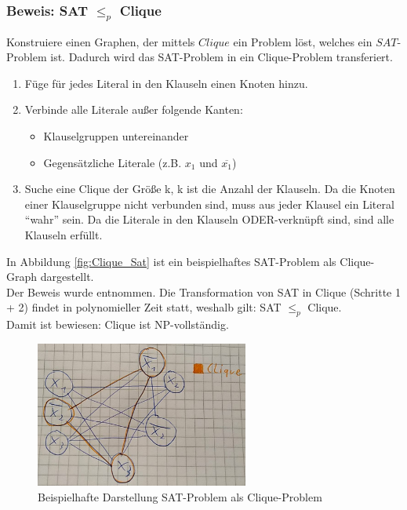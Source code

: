 \documentclass[ngerman]{article}
\begin{document}
\subsubsection{Beweis: SAT $\le_p$ Clique}
Konstruiere einen Graphen, der mittels \(Clique\) ein Problem löst, welches ein \(SAT\)-Problem ist.
Dadurch wird das SAT-Problem in ein Clique-Problem transferiert.
\begin{enumerate}
\item Füge für jedes Literal in den Klauseln einen Knoten hinzu.
\item Verbinde alle Literale außer folgende Kanten:
\begin{itemize}
\item Klauselgruppen untereinander
\item Gegensätzliche Literale (z.B. \(x_1\) und \(\overline{x_1}\))
\end{itemize}
\item Suche eine Clique der Größe k, k ist die Anzahl der Klauseln.
Da die Knoten einer Klauselgruppe nicht verbunden sind, muss aus jeder Klausel ein Literal ``wahr'' sein.
Da die Literale in den Klauseln ODER-verknüpft sind, sind alle Klauseln erfüllt.\\
\end{enumerate}
In Abbildung \vref{fig:Clique_Sat} ist ein beispielhaftes SAT-Problem als Clique-Graph dargestellt.\\
Der Beweis wurde \cite{weitz} entnommen.
Die Transformation von SAT in Clique (Schritte 1 + 2) findet in polynomieller Zeit statt, weshalb gilt: SAT $\le_p$ Clique.\\
Damit ist bewiesen: Clique ist NP-vollständig.
\begin{figure}[H]
	\centering
	\includegraphics[width=7cm]{figures/clique_sat.png}
	\caption{Beispielhafte Darstellung SAT-Problem als Clique-Problem}
	\label{fig:Clique_Sat}
\end{figure}

\newpage
\def\refname{Literaturverzeichnis}
\printbibliography
\end{document}
